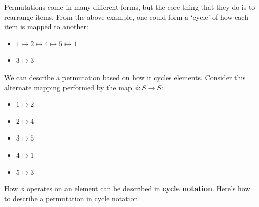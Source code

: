 Permutations come in many different forms, but the core thing that they do is to rearrange items. From the above example, one could form a `cycle' of how each item is mapped to another:
\begin{itemize}
    \item $1 \mapsto 2 \mapsto 4 \mapsto 5 \mapsto 1$
    \item $3 \mapsto 3$
\end{itemize}
We can describe a permutation based on how it cycles elements. Consider this alternate mapping performed by the map $\phi: S \to S$:
\begin{itemize}
    \item $1 \mapsto 2$
    \item $2 \mapsto 4$
    \item $3 \mapsto 5$
    \item $4 \mapsto 1$
    \item $5 \mapsto 3$
\end{itemize}
How $\phi$ operates on an element can be described in \textbf{cycle notation}. Here's how to describe a permutation in cycle notation.
